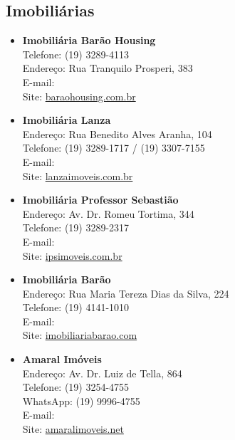 \subsection{Imobiliárias}

\begin{itemize}
    \item   \textbf{Imobiliária Barão Housing}
        \\Telefone: (19) 3289-4113
        \\Endereço: Rua Tranquilo Prosperi, 383
        \\E-mail: 
        \\Site: \url{baraohousing.com.br}

    \item   \textbf{Imobiliária Lanza}
        \\Endereço: Rua Benedito Alves Aranha, 104
        \\Telefone: (19) 3289-1717 / (19) 3307-7155
        \\E-mail: 
        \\Site: \url{lanzaimoveis.com.br}

    \item   \textbf{Imobiliária Professor Sebastião}
        \\Endereço: Av. Dr. Romeu Tortima, 344
        \\Telefone: (19) 3289-2317
        \\E-mail: 
        \\Site: \url{ipsimoveis.com.br}

    \item   \textbf{Imobiliária Barão}
        \\Endereço: Rua Maria Tereza Dias da Silva, 224
        \\Telefone: (19) 4141-1010
        \\E-mail: 
        \\Site: \url{imobiliariabarao.com}

    \item   \textbf{Amaral Imóveis}
        \\Endereço: Av. Dr. Luiz de Tella, 864
        \\Telefone: (19) 3254-4755
        \\WhatsApp: (19) 9996-4755
        \\E-mail: 
        \\Site: \url{amaralimoveis.net}


\end{itemize}
